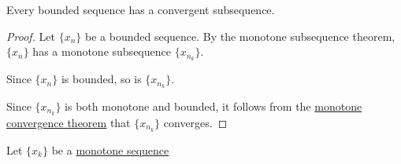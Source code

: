 
Every bounded sequence has a convergent subsequence.

\begin{proof}
	\def\xn{\{x_n\}}
  \def\xnk{\{x_{n_k}\}}

  Let $\xn$ be a bounded sequence. By the monotone subsequence
  theorem, $\xn$ has a monotone subsequence $\xnk$.

  Since $\xn$ is bounded, so is $\xnk$.

  Since $\xnk$ is both monotone and bounded, it follows from the
  \hyperref[ca25eb7]{monotone convergence theorem} that $\xnk$
  converges.
\end{proof}


Let $\{x_k\}$ be a \hyperref[d5142a8]{monotone sequence}
